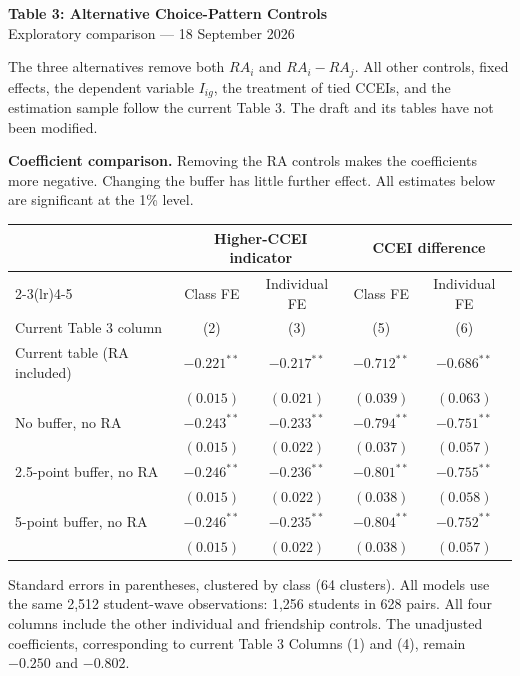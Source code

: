 \documentclass[11pt]{article}
\begin{document}
\begin{center}
{\Large\bfseries Table 3: Alternative Choice-Pattern Controls}\\[5pt]
Exploratory comparison --- 18 September 2026
\end{center}
The three alternatives remove both $RA_i$ and $RA_i-RA_j$. All other controls, fixed effects, the dependent variable $I_{ig}$, the treatment of tied CCEIs, and the estimation sample follow the current Table 3. The draft and its tables have not been modified.

\textbf{Coefficient comparison.} Removing the RA controls makes the coefficients more negative. Changing the buffer has little further effect. All estimates below are significant at the 1\% level.

\begin{center}
\small
\begin{tabular}{lcccc}
\toprule
& \multicolumn{2}{c}{Higher-CCEI indicator} & \multicolumn{2}{c}{CCEI difference}\\
\cmidrule(lr){2-3}\cmidrule(lr){4-5}
& Class FE & Individual FE & Class FE & Individual FE\\
Current Table 3 column & (2) & (3) & (5) & (6)\\
\midrule
Current table (RA included) & $-0.221^{**}$ & $-0.217^{**}$ & $-0.712^{**}$ & $-0.686^{**}$ \\
 & $(0.015)$ & $(0.021)$ & $(0.039)$ & $(0.063)$ \\
No buffer, no RA & $-0.243^{**}$ & $-0.233^{**}$ & $-0.794^{**}$ & $-0.751^{**}$ \\
 & $(0.015)$ & $(0.022)$ & $(0.037)$ & $(0.057)$ \\
2.5-point buffer, no RA & $-0.246^{**}$ & $-0.236^{**}$ & $-0.801^{**}$ & $-0.755^{**}$ \\
 & $(0.015)$ & $(0.022)$ & $(0.038)$ & $(0.058)$ \\
5-point buffer, no RA & $-0.246^{**}$ & $-0.235^{**}$ & $-0.804^{**}$ & $-0.752^{**}$ \\
 & $(0.015)$ & $(0.022)$ & $(0.038)$ & $(0.057)$ \\
\bottomrule
\end{tabular}
\end{center}
{\footnotesize Standard errors in parentheses, clustered by class (64 clusters). All models use the same 2,512 student-wave observations: 1,256 students in 628 pairs. All four columns include the other individual and friendship controls. The unadjusted coefficients, corresponding to current Table 3 Columns (1) and (4), remain $-0.250$ and $-0.802$.}
\end{document}
